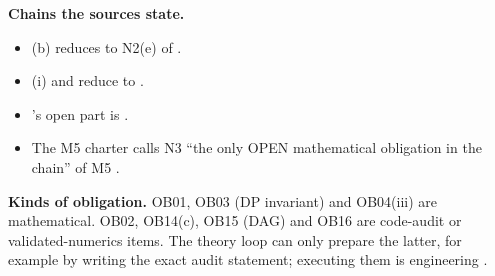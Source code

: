 \begin{agentnote}
\textbf{Chains the sources state.}
\begin{itemize}
\item {}(b) reduces to N2(e) of .
\item {}(i) and  reduce to .
\item {}'s open part is .
\item The M5 charter calls N3 ``the only OPEN mathematical obligation in the chain'' of M5 .
\end{itemize}

\textbf{Kinds of obligation.} OB01, OB03 (DP invariant) and OB04(iii) are mathematical. OB02, OB14(c), OB15 (DAG) and OB16 are code-audit or validated-numerics items. The theory loop can only prepare the latter, for example by writing the exact audit statement; executing them is engineering .
\end{agentnote}
